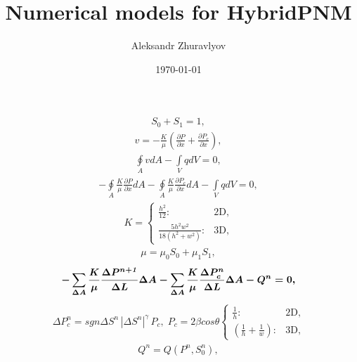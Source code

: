 \documentclass[a4paper,12pt]{extreport}
\author{Aleksandr Zhuravlyov}
\title{Numerical models for HybridPNM}
\date{\today}
\begin{document}
  \pagecolor{pageColor}
  \color{fontColor}


  \begin{eqnarray}
    S_{\mathit 0} + S_{\mathit 1} = \mathit{1},
  \end{eqnarray}
  \begin{eqnarray}
    v = - \frac{K}{\mu} \left(\frac{\partial P}{\partial x} +\frac{\partial P_c}{\partial x}\right),
  \end{eqnarray}
  \begin{eqnarray}
    \oint \limits_{A} v d A - \int \limits_{V} q d V = 0,
  \end{eqnarray}
  \begin{eqnarray}
    -\oint \limits_{A} \frac{K}{\mu} \frac{\partial P}{\partial x} d A - \oint \limits_{A} \frac{K}{\mu}  \frac{\partial P_c}{\partial x} d A - \int \limits_{V} q d V = 0,
  \end{eqnarray}
  \begin{eqnarray}
  K =\begin{cases}
  \frac{h^{\mathit 2}}{\mathit{12}}: &\text{2D},\\
  \frac{\mathit{5}h^{\mathit 2} w^{\mathit 2}}{\mathit{18}\left(h^{\mathit 2} + w^{\mathit 2}\right)}: &\text{3D},
  \end{cases}
  \end{eqnarray}
  \begin{eqnarray}
   \mu = \mu_{\mathit 0} S_{\mathit 0} + \mu_{\mathit 1} S_{\mathit 1},
  \end{eqnarray}
  \begin{eqnarray}
    \boldmath
    \begin{gathered}
      -\sum_{\Delta A} \frac{K}{\mu} \frac{\Delta P^{n + \mathit{1}}}{\Delta L} \Delta A - \sum_{\Delta A} \frac{K}{\mu} \frac{\Delta P^{n}_c}{\Delta L}   \Delta A - Q^n = 0,
    \end{gathered}
  \end{eqnarray}
  \begin{eqnarray}
    \Delta P_c^n = sgn\Delta S^n \, |\Delta  S^n|^\gamma \, P_c, \;
    P_c = \mathit 2 \beta cos \theta \begin{cases}
    \frac{\mathit 1}{h}: &\text{2D},\\
    \left(\frac{\mathit 1}{h} + \frac{\mathit 1}{w}\right): &\text{3D},
    \end{cases}    
  \end{eqnarray}
  \begin{eqnarray}
      Q^n = Q\left(P^n, S_{\mathit 0}^n\right),
  \end{eqnarray}
\end{document}
